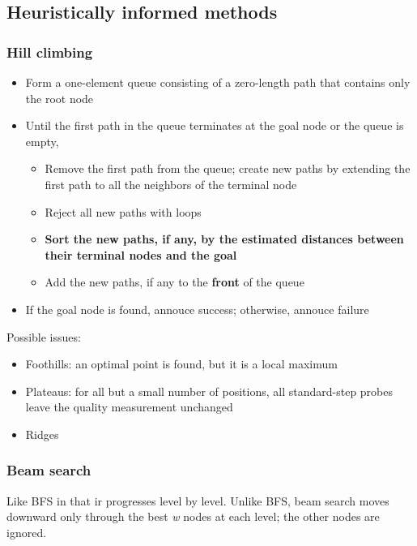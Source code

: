 \documentclass{article}
\begin{document}
\subsection{Heuristically informed methods}

\subsubsection{Hill climbing}

\begin{itemize}
  \item Form a one-element queue consisting of a zero-length path
    that contains only the root node
  \item Until the first path in the queue terminates at the goal node 
    or the queue is empty,
    \begin{itemize}
      \item Remove the first path from the queue; create new paths
        by extending the first path to all the neighbors of the 
        terminal node
      \item Reject all new paths with loops
      \item \textbf{Sort the new paths, if any, by the estimated distances 
        between their terminal nodes and the goal}
      \item Add the new paths, if any to the \textbf{front} of the queue
    \end{itemize}
  \item If the goal node is found, annouce success; otherwise, annouce 
    failure
\end{itemize}

Possible issues:
\begin{itemize}
  \item Foothills: an optimal point is found, but it is a local maximum
  \item Plateaus: for all but a small number of positions, all standard-step
    probes leave the quality measurement unchanged
  \item Ridges
\end{itemize}

\subsubsection{Beam search}

Like BFS in that ir progresses level by level. Unlike BFS, beam 
search moves downward only through the best \textit{w} 
nodes at each level; the other nodes are ignored.
\end{document}
